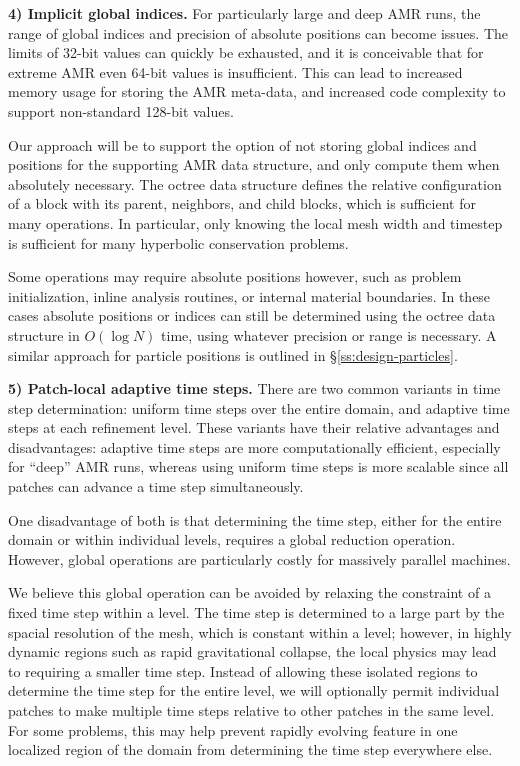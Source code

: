 \documentclass[10pt]{article}
\begin{document}
\textbf{4) Implicit global indices.}  For particularly large and deep
AMR runs, the range of global indices and precision of absolute
positions can become issues.  The limits of 32-bit values can quickly
be exhausted, and it is conceivable that for extreme AMR even 64-bit
values is insufficient.  This can lead to increased memory usage for
storing the AMR meta-data, and increased code complexity to support
non-standard 128-bit values.

Our approach will be to support the option of not storing global
indices and positions for the supporting AMR data structure, and only
compute them when absolutely necessary.  The octree data structure
defines the relative configuration of a block with its parent,
neighbors, and child blocks, which is sufficient for many operations.
In particular, only knowing the local mesh width and timestep is
sufficient for many hyperbolic conservation problems.

Some operations may require absolute positions however, such as
problem initialization, inline analysis routines, or internal material
boundaries.  In these cases absolute positions or indices can still be
determined using the octree data structure in $O(\log N)$ time, using
whatever precision or range is necessary.  A similar approach for
particle positions is outlined in \S\ref{ss:design-particles}.



\textbf{5) Patch-local adaptive time steps.} There are two common
variants in time step determination: uniform time steps over the
entire domain, and adaptive time steps at each refinement level.
These variants have their relative advantages and disadvantages:
adaptive time steps are more computationally efficient, especially for
``deep'' AMR runs, whereas using uniform time steps is more scalable
since all patches can advance a time step simultaneously.

One disadvantage of both is that determining the time step, either for
the entire domain or within individual levels, requires a global
reduction operation.  However, global operations are particularly costly for
massively parallel machines.  

We believe this global operation can be avoided by relaxing the
constraint of a fixed time step within a level.  The time step is
determined to a large part by the spacial resolution of the mesh,
which is constant within a level; however, in highly dynamic regions
such as rapid gravitational collapse, the local physics may lead to
requiring a smaller time step.  Instead of allowing these isolated
regions to determine the time step for the entire level, we will
optionally permit individual patches to make multiple time steps
relative to other patches in the same level.  For some problems, this
may help prevent rapidly evolving feature in one localized region of
the domain from determining the time step everywhere else.
\end{document}
